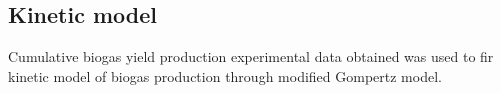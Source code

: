 \subsection{Kinetic model}
Cumulative biogas yield production experimental data obtained was used to fir  kinetic model of biogas production through modified Gompertz model.